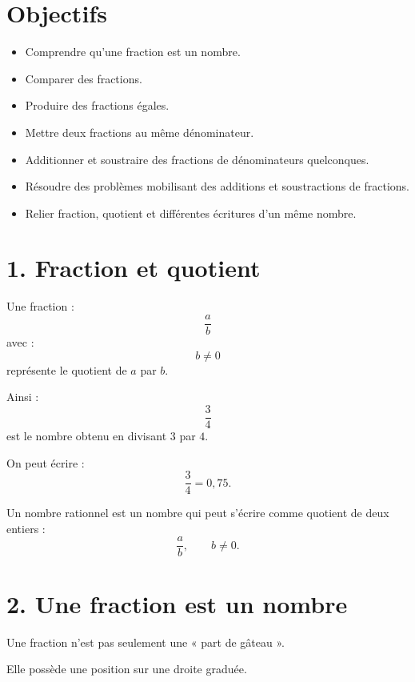 
\section{Objectifs}

\begin{itemize}
\item Comprendre qu'une fraction est un nombre.
\item Comparer des fractions.
\item Produire des fractions égales.
\item Mettre deux fractions au même dénominateur.
\item Additionner et soustraire des fractions de dénominateurs quelconques.
\item Résoudre des problèmes mobilisant des additions et soustractions de fractions.
\item Relier fraction, quotient et différentes écritures d'un même nombre.
\end{itemize}

\section{1. Fraction et quotient}

Une fraction :
\[
\dfrac{a}{b}
\]
avec :
\[
b\neq0
\]
représente le quotient de $a$ par $b$.

Ainsi :
\[
\dfrac34
\]
est le nombre obtenu en divisant $3$ par $4$.

On peut écrire :
\[
\dfrac34=0{,}75.
\]

\begin{definition}
Un nombre rationnel est un nombre qui peut s'écrire comme quotient de deux entiers :
\[
\dfrac{a}{b},
\qquad b\neq0.
\]
\end{definition}

\section{2. Une fraction est un nombre}

Une fraction n'est pas seulement une « part de gâteau ».

Elle possède une position sur une droite graduée.


